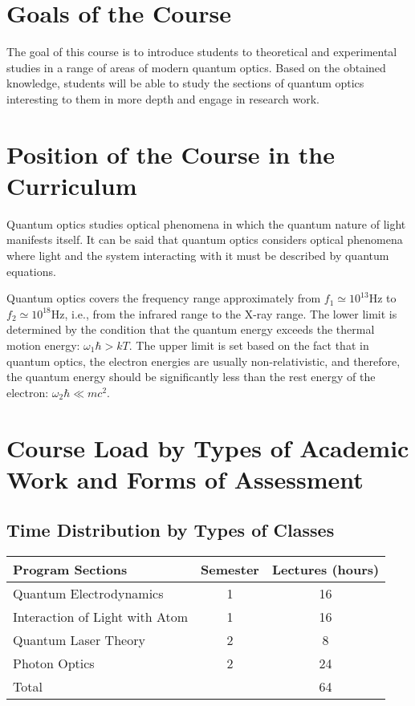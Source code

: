 


\Russian


\section{Goals of the Course}
The goal of this course is to introduce students to theoretical and
experimental studies in a range of areas of modern quantum optics. Based
on the obtained knowledge, students will be able to study the sections
of quantum optics interesting to them in more depth and engage in
research work.

\section{Position of the Course in the Curriculum}
Quantum optics studies optical phenomena in which the quantum nature
of light manifests itself. It can be said that quantum optics considers
optical phenomena where light and the system interacting with it must
be described by quantum equations.

Quantum optics covers the frequency range approximately from
\(f_1 \simeq 10^{13} \mbox{Hz}\) to \(f_2 \simeq 10^{18}
\mbox{Hz}\), i.e., from the infrared range to the
X-ray range. The lower limit is determined by the condition that the
quantum energy exceeds the thermal motion energy:
\(\omega_1 \hbar > k T\). The upper limit
is set based on the fact that in quantum optics,
the electron energies are usually non-relativistic, and therefore,
the quantum energy should be significantly less than the rest energy of
the electron: \(\omega_2 \hbar \ll m c^2\).

\section{Course Load by Types of Academic Work and Forms of Assessment}
\subsection{Time Distribution by Types of Classes}
\begin{longtable}{|l|c|c|}
\hline
Program Sections & Semester & Lectures (hours) \\ \hline
Quantum Electrodynamics & 1 & 16 \\ 
Interaction of Light with Atom & 1 & 16\\ 
Quantum Laser Theory & 2 & 8 \\ 
Photon Optics & 2  & 24 \\ \hline
Total & & 64 \\ \hline
\end{longtable}

